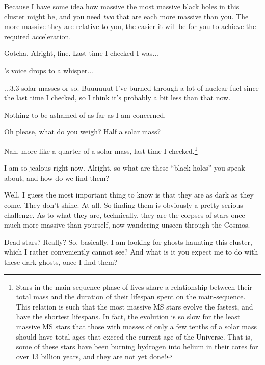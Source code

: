\documentclass[main.tex]{subfiles}
\begin{document}
\par \Enrico Because I have some idea how massive the most massive black holes in this cluster might be, and you need \textit{two} that are each more massive than you.  The more massive they are relative to you, the easier it will be for you to achieve the required acceleration.

\par \Sterope Gotcha.  Alright, fine.  Last time I checked I was...

\par \nar \rmsterope's voice drops to a whisper...

\par \Sterope ...3.3 solar masses or so.  Buuuuuut I've burned through a lot of nuclear fuel since the last time I checked, so I think it's probably a bit less than that now.  

\par \Enrico Nothing to be ashamed of as far as I am concerned.

\par \Sterope Oh please, what do you weigh?  Half a solar mass?

\par \Enrico Nah, more like a quarter of a solar mass, last time I checked.\footnote{Stars in the main-sequence phase of lives share a relationship between their total mass and the duration of their lifespan spent on the main-sequence.  This relation is such that the most massive MS stars evolve the fastest, and have the shortest lifespans.  In fact, the evolution is so slow for the least massive MS stars that those with masses of only a few tenths of a solar mass should have total ages that exceed the current age of the Universe.  That is, some of these stars have been burning hydrogen into helium in their cores for over 13 billion years, and they are not yet done!}

\par \Sterope I am so jealous right now.  Alright, so what are these ``black holes'' you speak about, and how do we find them?

\par \Enrico Well, I guess the most important thing to know is that they are as dark as they come.  They don't shine.  At all.  So finding them is obviously a pretty serious challenge.  As to what they are, technically, they are the corpses of stars once much more massive than yourself, now wandering unseen through the Cosmos.

\par \Sterope  Dead stars?  Really?  So, basically, I am looking for ghosts haunting this cluster, which I rather conveniently cannot see?  And what is it you expect me to do with these dark ghosts, once I find them?
\end{document}
